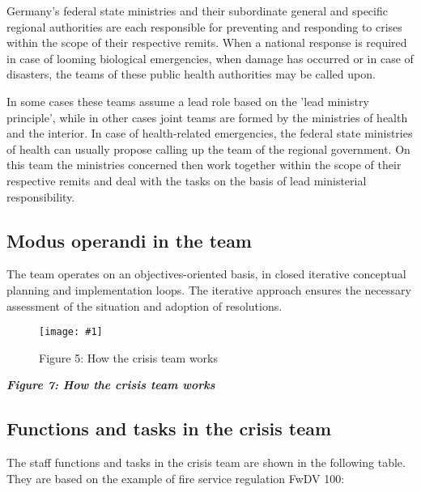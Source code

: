 \documentclass{article}
\newlength{\imgwidth}
\newcommand\scaledgraphics[2]{%
                
\settowidth{\imgwidth}{\texttt{[image: \#1]}}%
                
\setlength{\imgwidth}{\minof{\imgwidth}{#2\textwidth}}%
                
\texttt{[image: \#1]}%
                
}
\begin{document}
Germany's federal state ministries and their subordinate general and specific regional authorities are each responsible for preventing and responding to crises within the scope of their respective remits. When a national response is required in case of looming biological emergencies, when damage has occurred or in case of disasters, the teams of these public health authorities may be called upon.


In some cases these teams assume a lead role based on the 'lead ministry principle', while in other cases joint teams are formed by the ministries of health and the interior. In case of health-related emergencies, the federal state ministries of health can usually propose calling up the team of the regional government. On this team the ministries concerned then work together within the scope of their respective remits and deal with the tasks on the basis of lead ministerial responsibility.


\subsection{Modus operandi in the team}\label{H7603496}



The team operates on an objectives-oriented basis, in closed iterative conceptual planning and implementation loops. The iterative approach ensures the necessary assessment of the situation and adoption of resolutions.

\begin{figure}
\scaledgraphics{9383dba6-bfb1-4174-9c5d-226b568d1898.png}{1}
\caption*{Figure 5: How the crisis team works}\label{F77300271}
\end{figure}


\emph{\textbf{Figure 7: How the crisis team works}}


\subsection{Functions and tasks in the crisis team}\label{H1128570}



The staff functions and tasks in the crisis team are shown in the following table. They are based on the example of fire service regulation FwDV 100:
\end{document}
